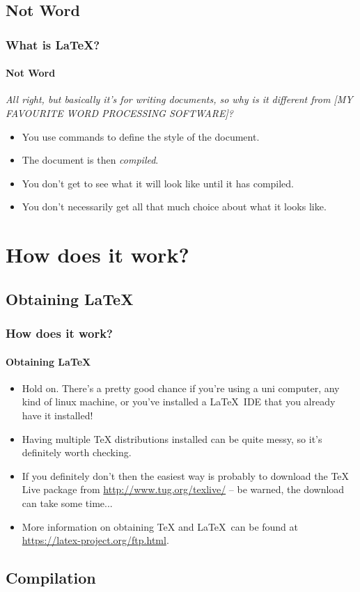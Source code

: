 \documentclass{beamer}
\begin{document}
\subsection{Not Word}
\begin{frame}
\frametitle{What is \LaTeX?}
\framesubtitle{Not Word}
\emph{All right, but basically it's for writing documents, so why is it different from [MY FAVOURITE WORD PROCESSING SOFTWARE]?}
\vspace{\baselineskip}
\begin{itemize}
\item You use commands to define the style of the document.
\item The document is then \emph{compiled}.
\item You don't get to see what it will look like until it has compiled.
\item You don't necessarily get all that much choice about what it looks like.
\end{itemize}
\end{frame}

\section{How does it work?}

\subsection{Obtaining \LaTeX}
\begin{frame}
\frametitle{How does it work?}
\framesubtitle{Obtaining \LaTeX}
\begin{itemize}
\item \alert{Hold on.} There's a pretty good chance if you're using a uni computer, any kind of linux machine, or you've installed a \LaTeX\ IDE that you already have it installed!
\item Having multiple TeX distributions installed can be quite messy, so it's definitely worth checking.
\item If you definitely don't then the easiest way is probably to download the TeX Live package from \url{http://www.tug.org/texlive/} -- be warned, the download can take some time...
\item More information on obtaining TeX and \LaTeX\ can be found at \url{https://latex-project.org/ftp.html}.
\end{itemize}
\end{frame}

\subsection{Compilation}
\end{document}
